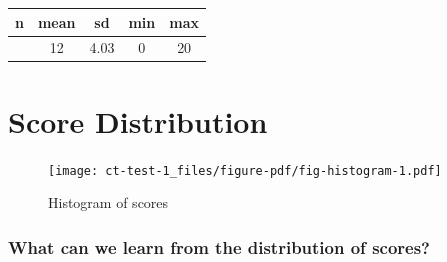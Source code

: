 \documentclass[
  letterpaper,
  DIV=11,
  numbers=noendperiod]{scrreprt}
\newenvironment{Shaded}{\begin{snugshade}}{\end{snugshade}}
\newcommand{\AttributeTok}[1]{\textcolor[rgb]{0.40,0.45,0.13}{#1}}
\newcommand{\CommentTok}[1]{\textcolor[rgb]{0.37,0.37,0.37}{#1}}
\newcommand{\DecValTok}[1]{\textcolor[rgb]{0.68,0.00,0.00}{#1}}
\newcommand{\FunctionTok}[1]{\textcolor[rgb]{0.28,0.35,0.67}{#1}}
\newcommand{\NormalTok}[1]{\textcolor[rgb]{0.00,0.23,0.31}{#1}}
\newcommand{\SpecialCharTok}[1]{\textcolor[rgb]{0.37,0.37,0.37}{#1}}
\newcommand{\StringTok}[1]{\textcolor[rgb]{0.13,0.47,0.30}{#1}}
\begin{document}
\begin{longtable}[]{@{}ccccc@{}}
\toprule\noalign{}
n & mean & sd & min & max \\
\midrule\noalign{}
\endhead
\bottomrule\noalign{}
\endlastfoot
3061 & 12 & 4.03 & 0 & 20 \\
\end{longtable}

\hypertarget{score-distribution}{%
\chapter{Score Distribution}\label{score-distribution}}

\begin{Shaded}
\end{Shaded}

\begin{figure}[H]

{\centering \texttt{[image: ct-test-1\_files/figure-pdf/fig-histogram-1.pdf]}

}

\caption{\label{fig-histogram}Histogram of scores}

\end{figure}

\hypertarget{what-can-we-learn-from-the-distribution-of-scores}{%
\subsection{What can we learn from the distribution of
scores?}\label{what-can-we-learn-from-the-distribution-of-scores}}
\end{document}

